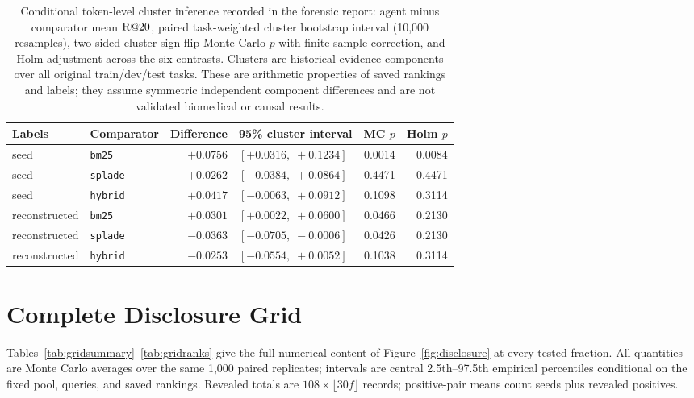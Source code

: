 \begin{table}[h]
\centering
\small
\caption{Conditional token-level cluster inference recorded in the forensic report: agent minus comparator mean $\mathrm{R}@20$, paired task-weighted cluster bootstrap interval (10,000 resamples), two-sided cluster sign-flip Monte Carlo $p$ with finite-sample correction, and Holm adjustment across the six contrasts. Clusters are historical evidence components over all original train/dev/test tasks. These are arithmetic properties of saved rankings and labels; they assume symmetric independent component differences and are not validated biomedical or causal results.}
\label{tab:cluster}
\begin{tabular}{@{}llrlrr@{}}
\toprule
Labels & Comparator & Difference & 95\% cluster interval & MC $p$ & Holm $p$ \\
\midrule
seed & \texttt{bm25} & $+0.0756$ & $[+0.0316,\;+0.1234]$ & 0.0014 & 0.0084 \\
seed & \texttt{splade} & $+0.0262$ & $[-0.0384,\;+0.0864]$ & 0.4471 & 0.4471 \\
seed & \texttt{hybrid} & $+0.0417$ & $[-0.0063,\;+0.0912]$ & 0.1098 & 0.3114 \\
reconstructed & \texttt{bm25} & $+0.0301$ & $[+0.0022,\;+0.0600]$ & 0.0466 & 0.2130 \\
reconstructed & \texttt{splade} & $-0.0363$ & $[-0.0705,\;-0.0006]$ & 0.0426 & 0.2130 \\
reconstructed & \texttt{hybrid} & $-0.0253$ & $[-0.0554,\;+0.0052]$ & 0.1038 & 0.3114 \\
\bottomrule
\end{tabular}
\end{table}

\section{Complete Disclosure Grid}
\label{app:grid}
Tables~\ref{tab:gridsummary}--\ref{tab:gridranks} give the full numerical content of Figure~\ref{fig:disclosure} at every tested fraction. All quantities are Monte Carlo averages over the same 1,000 paired replicates; intervals are central 2.5th--97.5th empirical percentiles conditional on the fixed pool, queries, and saved rankings. Revealed totals are $108\times\lfloor30f\rfloor$ records; positive-pair means count seeds plus revealed positives.


